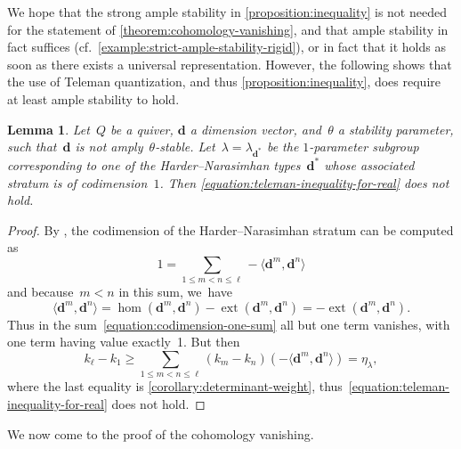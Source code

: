 \documentclass[11pt]{article}
\theoremstyle{plain}
\newtheorem{lemma}[theorem]{Lemma}
\theoremstyle{definition}
\newcommand\tuple[1]{\ensuremath{{\boldsymbol{#1}}}}
\begin{document}
We hope that the strong ample stability in \cref{proposition:inequality}
is not needed for the statement of \cref{theorem:cohomology-vanishing},
and that ample stability in fact suffices
(cf.~\cref{example:strict-ample-stability-rigid}),
or in fact that it holds as soon as there exists a universal representation.
However, the following shows that the use of Teleman quantization,
and thus \cref{proposition:inequality},
does require at least ample stability to hold.

\begin{lemma}
\label{lemma:teleman-implies-ample-stability}
Let~$Q$ be a quiver,
$\tuple{d}$ a dimension vector,
and~$\theta$ a stability parameter,
such that~$\tuple{d}$ is not amply~$\theta$-stable.
Let~$\lambda=\lambda_{\tuple{d}^*}$ be the $1$-parameter subgroup
corresponding to one of the Harder--Narasimhan types~$\tuple{d}^*$
whose associated stratum is of codimension~$1$.
Then \eqref{equation:teleman-inequality-for-real} does not hold.
\end{lemma}

\begin{proof}
By \cite[Prop.\,3.4]{MR1974891},
the codimension of the Harder--Narasimhan stratum can be computed as
\begin{equation}
\label{equation:codimension-one-sum}
1=\sum_{1\leq m<n\leq\ell}-\langle\tuple{d}^m,\tuple{d}^n\rangle
\end{equation}
and because~$m<n$ in this sum, we~have
\begin{equation*}
\langle\tuple{d}^m,\tuple{d}^n\rangle
=\operatorname{hom}(\tuple{d}^m,\tuple{d}^n)-\operatorname{ext}(\tuple{d}^m,\tuple{d}^n)
=-\operatorname{ext}(\tuple{d}^m,\tuple{d}^n).
\end{equation*}
Thus in the sum~\eqref{equation:codimension-one-sum}
all but one term vanishes,
with one term having value exactly~1.
But then
\begin{equation*}
k_\ell-k_1\geq\sum_{1\leq m<n\leq\ell}(k_m-k_n)(-\langle\tuple{d}^m,\tuple{d}^n\rangle)=\eta_\lambda,
\end{equation*}
where the last equality is \cref{corollary:determinant-weight},
thus~\eqref{equation:teleman-inequality-for-real} does not hold.
\end{proof}

We now come to the proof of the cohomology vanishing.
\end{document}
